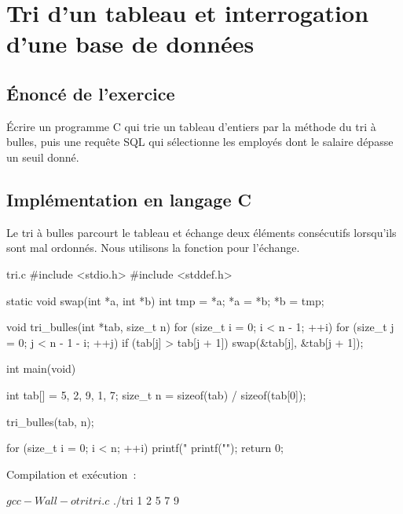 \chapter{Tri d'un tableau et interrogation d'une base de données}

\section{Énoncé de l'exercice}

\begin{remarque}[Consigne]
Écrire un programme C qui trie un tableau d'entiers par la méthode du tri à
bulles, puis une requête SQL qui sélectionne les employés dont le salaire
dépasse un seuil donné.
\end{remarque}

\section{Implémentation en langage C}

Le tri à bulles parcourt le tableau et échange deux éléments consécutifs
lorsqu'ils sont mal ordonnés. Nous utilisons la fonction 
pour l'échange.

\begin{code}[language=C, numbers=left]{tri.c}
#include <stdio.h>
#include <stddef.h>

static void swap(int *a, int *b)
{
    int tmp = *a;
    *a = *b;
    *b = tmp;
}

void tri_bulles(int *tab, size_t n)
{
    for (size_t i = 0; i < n - 1; ++i) {
        for (size_t j = 0; j < n - 1 - i; ++j) {
            if (tab[j] > tab[j + 1]) {
                swap(&tab[j], &tab[j + 1]);
            }
        }
    }
}

int main(void)
{
    int tab[] = {5, 2, 9, 1, 7};
    size_t n = sizeof(tab) / sizeof(tab[0]);

    tri_bulles(tab, n);

    for (size_t i = 0; i < n; ++i) {
        printf("%
    }
    printf("\n");
    return 0;
}
\end{code}

Compilation et exécution~:

\begin{terminal}
$ gcc -Wall -o tri tri.c
$ ./tri
1 2 5 7 9
\end{terminal}

